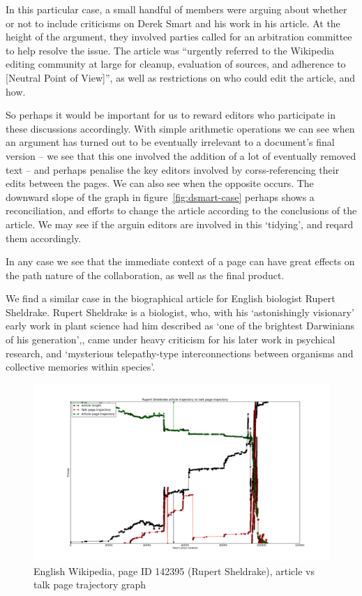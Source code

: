 In this particular case, a small handful of members were arguing about
whether or not to include criticisms on Derek Smart and his work in
his article. At the height of the argument, they involved parties
called for an arbitration committee to help resolve the issue. The
article was ``urgently referred to the Wikipedia editing community at
large for cleanup, evaluation of sources, and adherence to
[Neutral Point of View]'', as well as restrictions on who could edit
the article, and how.

So perhaps it would be important for us to reward editors who
participate in these discussions accordingly. With simple arithmetic
operations we can see when an argument has turned out to be eventually
irrelevant to a document's final version -- we see that this one
involved the addition of a lot of eventually removed text -- and
perhaps penalise the key editors involved by corss-referencing their
edits between the pages. We can also see when the opposite occurs. The
downward slope of the graph in figure~\ref{fig:dsmart-case}
perhaps shows a reconciliation, and efforts to change the article
according to the conclusions of the article. We may see if the arguin
editors are involved in this `tidying', and reqard them accordingly.

In any case we see that the immediate context of a page can have great
effects on the path nature of the collaboration, as well as the final
product.

We find a similar case in the biographical article for English
biologist Rupert Sheldrake. Rupert Sheldrake is a biologist, who, with
his `astonishingly visionary' early work in plant science had him
described as `one of the brightest Darwinians of his
generation',\cite{odyssey-auxin}\cite{guardian-shel}, came under heavy
criticism for his later work in psychical research, and `mysterious
telepathy-type interconnections between organisms and collective
memories within species'.\cite{sheldrake-biog}

\begin{figure}
  \centering
  \centering
  \includegraphics[width=\linewidth]{img/rsheldrake/RupertSheldrakecombo.png}
  \caption{English Wikipedia, page ID 142395 (Rupert Sheldrake),
    article vs talk page trajectory graph}
  \label{fig:sheldrake-plot}
\end{figure}

